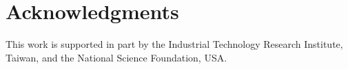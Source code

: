 \section*{Acknowledgments}
This work is supported in part by the Industrial Technology Research Institute, Taiwan, 
and the National Science Foundation, USA.
